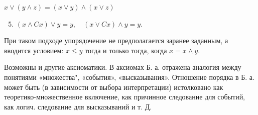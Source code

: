 \documentclass[10pt]{article}
\begin{document}
$x \vee(y \wedge z)=(x \vee y) \wedge(x \vee z)$



\begin{enumerate}

  \setcounter{enumi}{4}

  \item $(x \wedge C x) \vee y=y, \quad(x \vee C x) \wedge y=y$.

\end{enumerate}



При таком подходе упорядочение не предполагается заранее заданным, а вводится условием: $x \leqslant y$ тогда и только тогда, когда $x=x \wedge y$.



Возможны и другие аксиоматики. В аксиомах Б. а. отражена аналогия между понятиями «множества", «события», «высказывания». Отношение порядка в Б. а. может быть (в зависимости от выбора интерпретации) истолковано как теоретико-множественное включение, как причинное следование для событий, как логич. следование для высказываний и т. Д.
\end{document}
